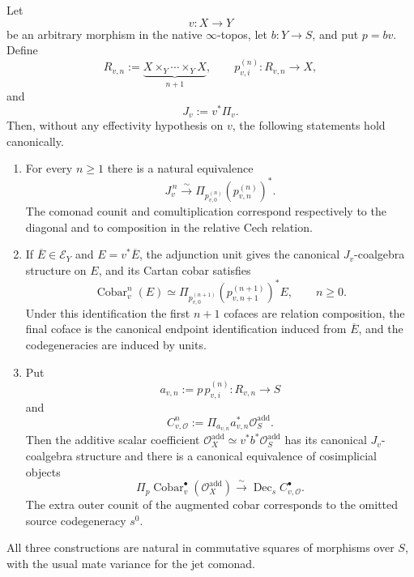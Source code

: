 \begin{theorem}
\label{thm:as-arbitrary-map-decalage}
Let
\[
    v:X\longrightarrow Y
\]
be an arbitrary morphism in the native $\infty$-topos, let
$b:Y\to S$, and put $p=bv$.  Define
\[
    R_{v,n}
    :=
    \underbrace{X\times_Y\cdots\times_YX}_{n+1},
    \qquad
    p_{v,i}^{(n)}:R_{v,n}\to X,
\]
and
\[
    J_v:=v^*\Pi_v.
\]
Then, without any effectivity hypothesis on $v$, the following statements
hold canonically.

\begin{enumerate}
    \item For every $n\geq1$ there is a natural equivalence
    \[
    \boxed{
        J_v^{\,n}
        \xrightarrow{\sim}
        \Pi_{p_{v,0}^{(n)}}
        \left(p_{v,n}^{(n)}\right)^*.
    }
    \]
    The comonad counit and comultiplication correspond respectively to the
    diagonal and to composition in the relative Cech relation.

    \item If $\overline E\in\mathcal E_Y$ and $E=v^*\overline E$, the
    adjunction unit gives the canonical $J_v$-coalgebra structure on $E$, and
    its Cartan cobar satisfies
    \[
    \boxed{
        \operatorname{Cobar}_v^n(E)
        \simeq
        \Pi_{p_{v,0}^{(n+1)}}
        \left(p_{v,n+1}^{(n+1)}\right)^*E,
        \qquad n\geq0.
    }
    \]
    Under this identification the first $n+1$ cofaces are relation
    composition, the final coface is the canonical endpoint identification
    induced from $\overline E$, and the codegeneracies are induced by units.

    \item Put
    \[
        a_{v,n}:=p\,p_{v,i}^{(n)}:R_{v,n}\to S
    \]
    and
    \[
        C_{v,\mathcal O}^n
        :=
        \Pi_{a_{v,n}}a_{v,n}^*\mathcal O_S^{\mathrm{add}}.
    \]
    Then the additive scalar coefficient
    $\mathcal O_X^{\mathrm{add}}\simeq v^*b^*\mathcal O_S^{\mathrm{add}}$
    has its canonical $J_v$-coalgebra structure and there is a canonical
    equivalence of cosimplicial objects
    \[
    \boxed{
        \Pi_p
        \operatorname{Cobar}_v^\bullet
        (\mathcal O_X^{\mathrm{add}})
        \xrightarrow{\sim}
        \operatorname{Dec}_s C_{v,\mathcal O}^\bullet.
    }
    \]
    The extra outer counit of the augmented cobar corresponds to the omitted
    source codegeneracy $s^0$.
\end{enumerate}

All three constructions are natural in commutative squares of morphisms over
$S$, with the usual mate variance for the jet comonad.
\end{theorem}

